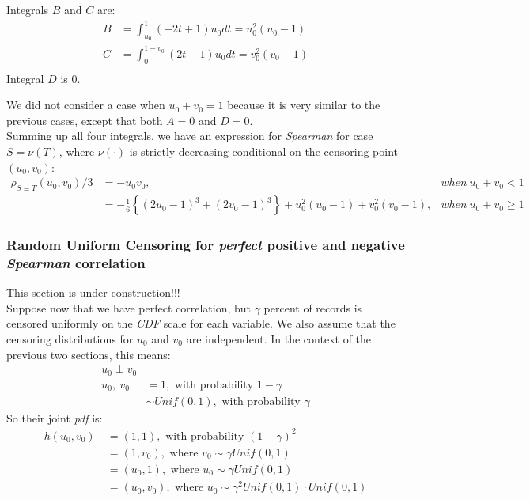 \documentclass[]{article}
\begin{document}
Integrals $B$ and $C$ are:
	$$
	\begin{aligned}
    B &= \int_{u_0}^1 (-2t + 1)u_0 dt =u_0^2(u_0 - 1)\\
    C &= \int_{0}^{1-v_0} (2t - 1)u_0 dt =v_0^2(v_0 - 1)\\
	\end{aligned}
	$$
Integral $D$ is $0$.

We did not consider a case when $u_0+v_0 = 1$ because it is very similar to the previous cases, except that both $A=0$ and $D=0$.\\
Summing up all four integrals, we have an expression for \emph{Spearman} for case $S=\nu(T)$, where $\nu(\cdot)$ is strictly decreasing conditional on the censoring point $(u_0, v_0)$:
	$$
	\begin{aligned}
    \rho_{S\equiv T}(u_0, v_0)/3 &= -u_0v_0, &when~u_0 + v_0 < 1\\
    &= -\frac{1}{6}\left\{  (2u_0 - 1)^3 + (2v_0 - 1)^3 \right\} + u_0^2(u_0 - 1) + v_0^2(v_0 - 1), &when~u_0 + v_0 \geq 1
	\end{aligned}
	$$

\subsubsection{Random Uniform Censoring for \emph{perfect} positive and negative \emph{Spearman} correlation}

{\LARGE{This section is under construction!!!}}\\
Suppose now that we have perfect correlation, but $\gamma$ percent of records is censored uniformly on the \emph{CDF} scale for each variable. We also assume that the censoring distributions for $u_0$ and $v_0$ are independent. In the context of the previous two sections, this means:
  $$
  \begin{aligned}
    u_0 \perp v_0 &\\
    u_0,~v_0~&=1, \text{ with probability }1-\gamma  \\
       &\sim Unif(0, 1), \text{ with probability }\gamma
  \end{aligned}
  $$
So their joint \emph{pdf} is:
  $$
  \begin{aligned}
    h(u_0, v_0)~&=(1, 1), \text{ with probability }(1-\gamma)^2  \\
                &=(1, v_0), \text{ where } v_0\sim \gamma Unif(0, 1) \\
                &=(u_0, 1), \text{ where } u_0\sim \gamma Unif(0, 1) \\
                &=(u_0, v_0), \text{ where } u_0\sim \gamma^2 Unif(0, 1)\cdot Unif(0, 1) \\
  \end{aligned}
  $$
\end{document}
